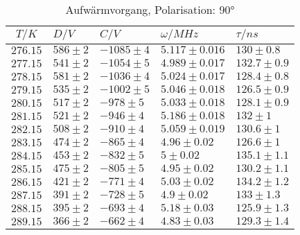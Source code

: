 \begin{table}[h!]
\scriptsize\centering
\begin{tabular}{|c|l|l|l|l|}
\hline
$T/K$&$D/V$&$C/V$&$\omega/MHz$&$\tau/ns$\\\hline\hline
$276.15$&$586\pm2$&$-1085\pm4$&$5.117\pm0.016$&$130\pm0.8$\\\hline
$277.15$&$541\pm2$&$-1054\pm5$&$4.989\pm0.017$&$132.7\pm0.9$\\\hline
$278.15$&$581\pm2$&$-1036\pm4$&$5.024\pm0.017$&$128.4\pm0.8$\\\hline
$279.15$&$535\pm2$&$-1002\pm5$&$5.046\pm0.018$&$126.5\pm0.9$\\\hline
$280.15$&$517\pm2$&$-978\pm5$&$5.033\pm0.018$&$128.1\pm0.9$\\\hline
$281.15$&$521\pm2$&$-946\pm4$&$5.186\pm0.018$&$132\pm1$\\\hline
$282.15$&$508\pm2$&$-910\pm4$&$5.059\pm0.019$&$130.6\pm1$\\\hline
$283.15$&$474\pm2$&$-865\pm4$&$4.96\pm0.02$&$126.6\pm1$\\\hline
$284.15$&$453\pm2$&$-832\pm5$&$5\pm0.02$&$135.1\pm1.1$\\\hline
$285.15$&$475\pm2$&$-805\pm5$&$4.95\pm0.02$&$130.2\pm1.1$\\\hline
$286.15$&$421\pm2$&$-771\pm4$&$5.03\pm0.02$&$134.2\pm1.2$\\\hline
$287.15$&$391\pm2$&$-728\pm5$&$4.9\pm0.02$&$133\pm1.3$\\\hline
$288.15$&$395\pm2$&$-693\pm4$&$5.18\pm0.03$&$125.9\pm1.3$\\\hline
$289.15$&$366\pm2$&$-662\pm4$&$4.83\pm0.03$&$129.3\pm1.4$\\\hline
\end{tabular}
\caption{Aufwärmvorgang, Polarisation: 90°\label{warm90}}
\end{table}
